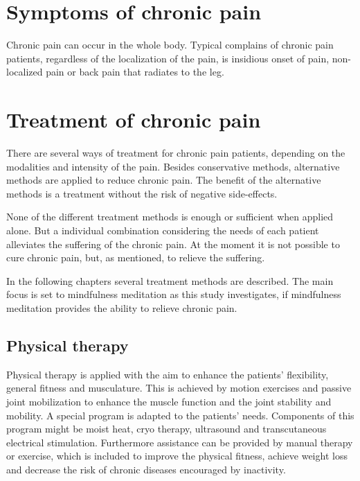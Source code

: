 \section{Symptoms of chronic pain}

Chronic pain can occur in the whole body. Typical complains of chronic pain patients, regardless of the localization of the pain, is insidious onset of pain, non-localized pain or back pain that radiates to the leg. \cite{marcus2009}

\section{Treatment of chronic pain}

There are several ways of treatment for chronic pain patients, depending on the modalities and intensity of the pain. Besides conservative methods, alternative methods are applied to reduce chronic pain. The benefit of the alternative methods is a treatment without the risk of negative side-effects. \cite{marcus2009,pope2017}

None of the different treatment methods is enough or sufficient when applied alone. But a individual combination considering the needs of each patient alleviates the suffering of the chronic pain.
At the moment it is not possible to cure chronic pain, but, as mentioned, to relieve the suffering. \cite{marcus2009,pope2017}

In the following chapters several treatment methods are described. The main focus is set to mindfulness meditation as this study investigates, if mindfulness meditation provides the ability to relieve chronic pain.

\subsection{Physical therapy}

Physical therapy is applied with the aim to enhance the patients' flexibility, general fitness and musculature. This is achieved by motion exercises and passive joint mobilization to enhance the muscle function and the joint stability and mobility. A special program is adapted to the patients' needs. Components of this program might be moist heat, cryo therapy, ultrasound and transcutaneous electrical stimulation. Furthermore assistance can be provided by manual therapy or exercise, which is included to improve the physical fitness, achieve weight loss and decrease the risk of chronic diseases encouraged by inactivity. \cite{marcus2009,pope2017}

